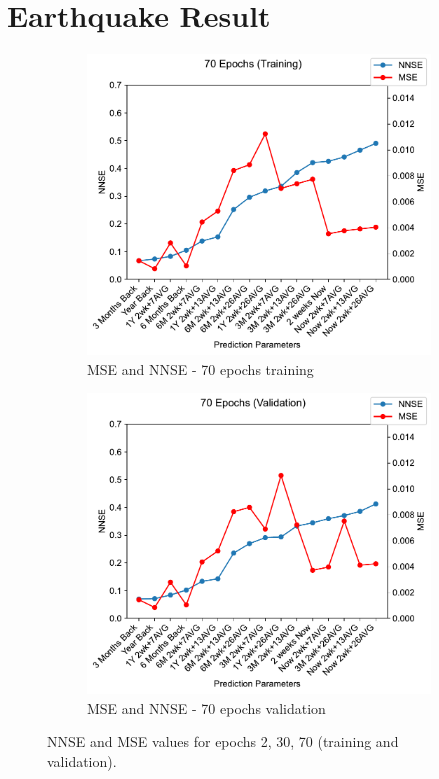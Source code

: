 
\section{Earthquake Result}

\begin{figure}[p]
     \centering
     \begin{subfigure}[b]{0.49\textwidth}
        \centering\includegraphics[width=1.0\linewidth]{images/70_training-MSE-and-NNSE.pdf}
        \caption{MSE and NNSE - 70 epochs training}
        \label{fig:tbd3}
     \end{subfigure}
     \hfill
     \begin{subfigure}[b]{0.49\textwidth}
        \centering\includegraphics[width=1.0\linewidth]{images/70_validation-MSE-and-NNSE.pdf}
        \caption{MSE and NNSE - 70 epochs validation}
        \label{fig:tbd4}
     \end{subfigure}
        \caption{NNSE and MSE values for epochs 2, 30, 70 (training and validation).}
        \label{fig:six graphs}
\end{figure}
